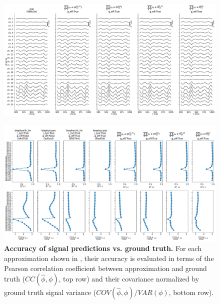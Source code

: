 \begin{figure}[!ht]
\begin{center}
\includegraphics[width=\textwidth]{Figures/Ch-LFPy/Ch-LFPy-signal_vs_kernel_predictions.pdf}
\end{center}
\caption{
}
\label{fig:LFPy_kernel_predictions}
\end{figure}



\begin{figure}[!ht]
\begin{center}
\includegraphics[width=\textwidth]{Figures/Ch-LFPy/Ch-LFPy-correlations.pdf}
\end{center}
\caption{\textbf{Accuracy of signal predictions vs. ground truth.}
For each approximation shown in ,
their accuracy is evaluated in terms of the  Pearson correlation coefficient between approximation and ground truth ($CC(\hat{\phi}, \phi)$, top row) and
their covariance normalized by ground truth signal variance ($COV(\hat{\phi}, \phi)/VAR(\phi)$, bottom row).
}
\label{fig:LFPy_correlations}
\end{figure}


